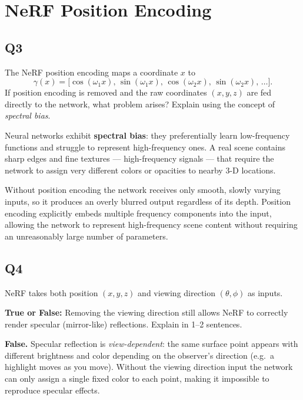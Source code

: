 \documentclass[12pt]{article}
\begin{document}
\section*{NeRF Position Encoding}

\subsection*{Q3}
The NeRF position encoding maps a coordinate $x$ to
\[
  \gamma(x)=\bigl[\cos(\omega_1 x),\,\sin(\omega_1 x),\,
                   \cos(\omega_2 x),\,\sin(\omega_2 x),\,\ldots\bigr].
\]
If position encoding is removed and the raw coordinates $(x,y,z)$ are fed
directly to the network, what problem arises? Explain using the concept of
\emph{spectral bias}.

\begin{answerbox}
Neural networks exhibit \textbf{spectral bias}: they preferentially learn
low-frequency functions and struggle to represent high-frequency ones.
A real scene contains sharp edges and fine textures --- high-frequency signals
--- that require the network to assign very different colors or opacities to
nearby 3-D locations.

Without position encoding the network receives only smooth, slowly varying
inputs, so it produces an overly blurred output regardless of its depth.
Position encoding explicitly embeds multiple frequency components into the input,
allowing the network to represent high-frequency scene content without requiring
an unreasonably large number of parameters.
\end{answerbox}

\subsection*{Q4}
NeRF takes both position $(x,y,z)$ and viewing direction $(\theta,\phi)$ as
inputs.

\medskip
\noindent\textbf{True or False:} Removing the viewing direction still allows
NeRF to correctly render specular (mirror-like) reflections.
Explain in 1--2 sentences.

\begin{answerbox}
\textbf{False.}  Specular reflection is \emph{view-dependent}: the same surface
point appears with different brightness and color depending on the observer's
direction (e.g.\ a highlight moves as you move).  Without the viewing direction
input the network can only assign a single fixed color to each point, making it
impossible to reproduce specular effects.
\end{answerbox}
\end{document}
